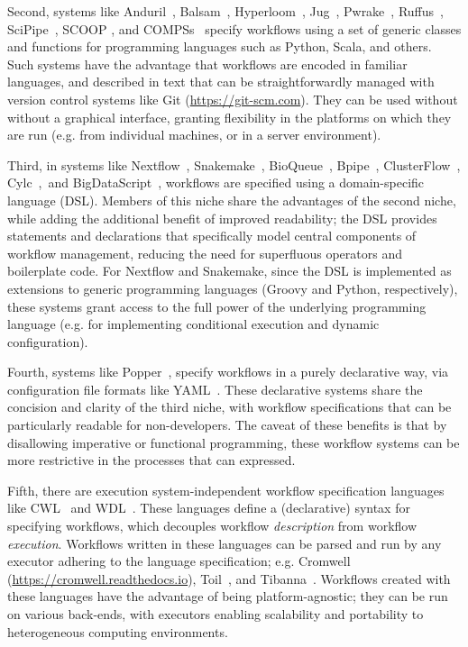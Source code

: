 \documentclass[parskip=half]{scrartcl}
\let\plainurl\url
\renewcommand{\url}[1]{\protect\plainurl{#1}}
\begin{document}
Second, systems like Anduril~\parencite{Cervera2019}, Balsam~\parencite{papka2018}, Hyperloom~\parencite{cima2018hyperloom}, Jug~\parencite{Coelho_2017}, Pwrake~\parencite{Tanaka_2010}, Ruffus~\parencite{Goodstadt2010}, SciPipe~\parencite{Lampa2019}, SCOOP \parencite{SCOOP_XSEDE2014}, and COMPSs~\parencite{Lordan_2013} specify workflows using a set of generic classes and functions for programming languages such as Python, Scala, and others.
Such systems have the advantage that workflows are encoded in familiar languages, and described in text that can be straightforwardly managed with version control systems like Git (\url{https://git-scm.com}). They can be used without without a graphical interface, granting flexibility in the platforms on which they are run (e.g. from individual machines, or in a server environment).

Third, in systems like Nextflow~\parencite{Di_Tommaso_2017}, Snakemake~\parencite{Köster2012}, BioQueue~\parencite{Yao2017}, Bpipe~\parencite{Sadedin2012}, ClusterFlow~\parencite{Ewels2016}, Cylc~\parencite{J_Oliver_2018},~and BigDataScript~\parencite{Cingolani_2014}, workflows are specified using a domain-specific language (DSL).
Members of this niche share the advantages of the second niche, while adding the additional benefit of improved readability; the DSL provides statements and declarations that specifically model central components of workflow management, reducing the need for superfluous operators and boilerplate code.
For Nextflow and Snakemake, since the DSL is implemented as extensions to generic programming languages (Groovy and Python, respectively), these systems grant access to the full power of the underlying programming language (e.g. for implementing conditional execution and dynamic configuration).

Fourth, systems like Popper~\parencite{Jimenez_2017}, specify workflows in a purely declarative way, via configuration file formats like YAML~\parencite{Evans2009-vp}.
These declarative systems share the concision and clarity of the third niche, with workflow specifications that can be particularly readable for non-developers. The caveat of these benefits is that by disallowing imperative or functional programming, these workflow systems can be more restrictive in the processes that can expressed.

Fifth, there are execution system-independent workflow specification languages like CWL~\parencite{cwl} and WDL~\parencite{voss_full-stack_2017}.
These languages define a (declarative) syntax for specifying workflows, which decouples workflow \emph{description} from workflow \emph{execution}. Workflows written in these languages can be parsed and run by any executor adhering to the language specification; e.g. Cromwell (\url{https://cromwell.readthedocs.io}), Toil~\parencite{Vivian_2017}, and Tibanna~\parencite{Lee_2019}. Workflows created with these languages have the advantage of being platform-agnostic; they can be run on various back-ends, with executors enabling scalability and portability to heterogeneous computing environments.
\end{document}
